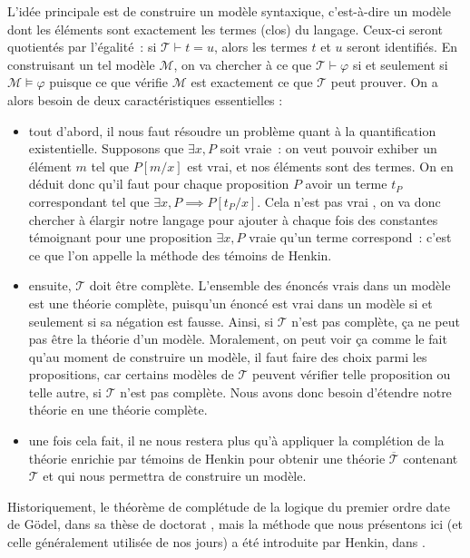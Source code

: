 L'idée principale est de construire un modèle syntaxique, c'est-à-dire un modèle
dont les éléments sont exactement les termes (clos) du langage. Ceux-ci seront
quotientés par l'égalité~: si $\mathcal T \vdash t = u$, alors les termes $t$ et
$u$ seront identifiés. En construisant un tel modèle $\mathcal M$, on va
chercher à ce que $\mathcal T \vdash \varphi$ si et seulement si
$\mathcal M\vDash \varphi$ puisque ce que vérifie $\mathcal M$ est exactement ce
que $\mathcal T$ peut prouver. On a alors besoin de deux caractéristiques
essentielles :
\begin{itemize}
\item tout d'abord, il nous faut résoudre un problème quant à la quantification
  existentielle. Supposons que $\exists x,P$ soit vraie~: on veut pouvoir
  exhiber un élément $m$ tel que $P[m/x]$ est vrai, et nos éléments sont des
  termes. On en déduit donc qu'il faut pour chaque proposition $P$ avoir un
  terme $t_P$ correspondant tel que $\exists x, P \implies P[t_P/x]$. Cela n'est
  pas vrai , on va donc chercher à élargir notre langage
  pour ajouter à chaque fois des constantes témoignant pour une proposition
  $\exists x,P$ vraie qu'un terme correspond~: c'est ce que l'on appelle la
  méthode des témoins de Henkin.
\item ensuite, $\mathcal T$ doit être complète. L'ensemble des énoncés
  vrais dans un modèle est une théorie complète, puisqu'un énoncé est vrai dans
  un modèle si et seulement si sa négation est fausse. Ainsi, si $\mathcal T$
  n'est pas complète, ça ne peut pas être la théorie d'un modèle. Moralement, on
  peut voir ça comme le fait qu'au moment de construire un modèle, il faut faire
  des choix parmi les propositions, car certains modèles de $\mathcal T$ peuvent
  vérifier telle proposition ou telle autre, si $\mathcal T$ n'est pas complète.
  Nous avons donc besoin d'étendre notre théorie en une théorie complète.
\item une fois cela fait, il ne nous restera plus qu'à appliquer la complétion
  de la théorie enrichie par témoins de Henkin pour obtenir une théorie
  $\overline{\mathcal T}$ contenant $\mathcal T$ et qui nous permettra de
  construire un modèle.
\end{itemize}

Historiquement, le théorème de complétude de la logique du premier ordre date de
Gödel, dans sa thèse de doctorat \cite{GödelCompleteness}, mais la méthode que
nous présentons ici (et celle généralement utilisée de nos jours) a été
introduite par Henkin, dans \cite{HenkinCompleteness}.

